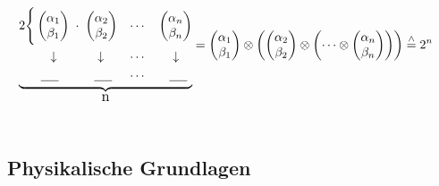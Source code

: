 \documentclass[12pt]{report}
\begin{document}
\begin{align*}
\underbrace{
\begin{alignedat}{2}
2 \Bigg\{ \begin{pmatrix} \alpha_1 \\ \beta_1 \end{pmatrix} &\hspace{1mm}\cdot\hspace{1mm} \begin{pmatrix} \alpha_2 \\ \beta_2 \end{pmatrix} &\quad  \cdots &\quad \begin{pmatrix} \alpha_n \\ \beta_n \end{pmatrix}\\
\downarrow\quad &\qquad \downarrow &\quad \cdots &\qquad \downarrow \\ 
\underline{\hspace{5mm}} \hspace{3mm} &\qquad \underline{\hspace{5mm}} & \quad \cdots & \qquad \underline{\hspace{5mm}}
\end{alignedat}
}_{\text{\begin{large}n\end{large}}} &=
\begin{pmatrix} \alpha_1 \\ \beta_1 \end{pmatrix} \otimes \left(\begin{pmatrix} \alpha_2 \\ \beta_2 \end{pmatrix} \otimes\left(\cdots \otimes \begin{pmatrix} \alpha_n \\ \beta_n \end{pmatrix}\right)\right)
 \stackrel{\wedge}{=} 2^n
\end{align*}\\

	
	\subsection{Physikalische Grundlagen}
	
\end{document}
